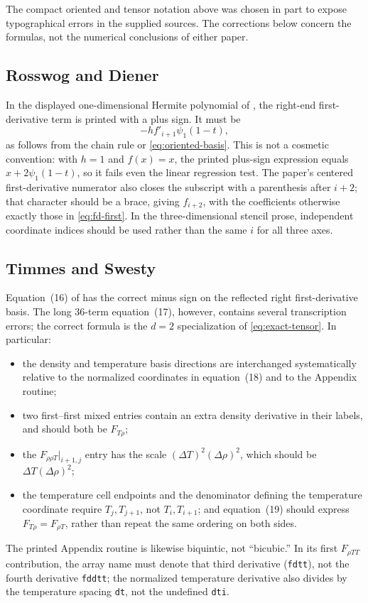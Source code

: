 \documentclass[11pt]{article}
\begin{document}
The compact oriented and tensor notation above was chosen in part to expose
typographical errors in the supplied sources.  The corrections below concern
the formulas, not the numerical conclusions of either paper.

\subsection{Rosswog and Diener}

In the displayed one-dimensional Hermite polynomial of
\cite{rosswog-diener}, the right-end first-derivative term is printed with a
plus sign.  It must be
\begin{equation}
  -h f'_{i+1}\psi_1(1-t),
  \label{eq:sphincs-sign-correction}
\end{equation}
as follows from the chain rule or \eqref{eq:oriented-basis}.  This is not a
cosmetic convention: with $h=1$ and $f(x)=x$, the printed plus-sign
expression equals $x+2\psi_1(1-t)$, so it fails even the linear regression
test.  The paper's centered first-derivative numerator also closes the
subscript with a parenthesis after $i+2$; that character should be a brace,
giving $f_{i+2}$, with the coefficients
otherwise exactly those in \eqref{eq:fd-first}.  In the three-dimensional
stencil prose, independent coordinate indices should be used rather than the
same $i$ for all three axes.

\subsection{Timmes and Swesty}

Equation~(16) of \cite{timmes-swesty} has the correct minus sign on the
reflected right first-derivative basis.  The long 36-term equation~(17),
however, contains several transcription errors; the correct formula is the
$d=2$ specialization of \eqref{eq:exact-tensor}.  In particular:
\begin{itemize}
  \item the density and temperature basis directions are interchanged
  systematically relative to the normalized coordinates in equation~(18)
  and to the Appendix routine;
  \item two first--first mixed entries contain an extra density derivative in
  their labels, and should both be $F_{T\rho}$;
  \item the $F_{\rho\rho T}|_{i+1,j}$ entry has the scale
  $(\Delta T)^2(\Delta\rho)^2$, which should be
  \(\Delta T(\Delta\rho)^2\);
  \item the temperature cell endpoints and the denominator defining the
  temperature coordinate require $T_j,T_{j+1}$, not $T_i,T_{i+1}$; and
  equation~(19) should express $F_{T\rho}=F_{\rho T}$, rather than repeat the
  same ordering on both sides.
\end{itemize}
The printed Appendix routine is likewise biquintic, not ``bicubic.''  In its
first $F_{\rho T T}$ contribution, the array name must denote that third
derivative (\texttt{fdtt}), not the fourth derivative
\texttt{fddtt}; the normalized temperature derivative also divides by the
temperature spacing \texttt{dt}, not the undefined \texttt{dti}.
\end{document}
